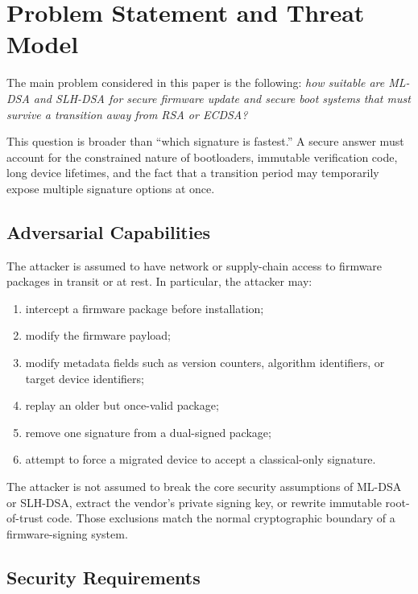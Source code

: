 \section{Problem Statement and Threat Model}

The main problem considered in this paper is the following: \textit{how suitable are ML-DSA and SLH-DSA for secure firmware update and secure boot systems that must survive a transition away from RSA or ECDSA?}

This question is broader than ``which signature is fastest.'' A secure answer must account for the constrained nature of bootloaders, immutable verification code, long device lifetimes, and the fact that a transition period may temporarily expose multiple signature options at once.

\subsection{Adversarial Capabilities}

The attacker is assumed to have network or supply-chain access to firmware packages in transit or at rest. In particular, the attacker may:
\begin{enumerate}
\item intercept a firmware package before installation;
\item modify the firmware payload;
\item modify metadata fields such as version counters, algorithm identifiers, or target device identifiers;
\item replay an older but once-valid package;
\item remove one signature from a dual-signed package;
\item attempt to force a migrated device to accept a classical-only signature.
\end{enumerate}

The attacker is not assumed to break the core security assumptions of ML-DSA or SLH-DSA, extract the vendor's private signing key, or rewrite immutable root-of-trust code. Those exclusions match the normal cryptographic boundary of a firmware-signing system.

\subsection{Security Requirements}

